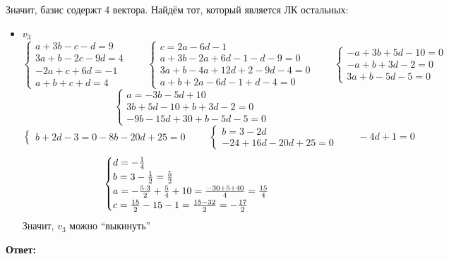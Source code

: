Значит, базис содержт 4 вектора. Найдём тот, который является ЛК остальных:
\begin{itemize}
	\item $ v_3 $
    $$
    \begin{cases}
    	a + 3b - c - d = 9 \\
        3a + b - 2c - 9d = 4 \\
        -2a + c + 6d = -1 \\
        a + b + c + d = 4
    \end{cases} \qquad
    \begin{cases}
    	c = 2a - 6d - 1 \\
        a + 3b - 2a + 6d - 1 - d - 9 = 0 \\
        3a + b - 4a + 12d + 2 - 9d - 4 = 0 \\
        a + b + 2a - 6d - 1 + d - 4 = 0
    \end{cases} \qquad
    \begin{cases}
    	-a + 3b + 5d - 10 = 0 \\
        -a + b + 3d - 2 = 0 \\
        3a + b - 5d - 5 = 0
    \end{cases} $$
    $$
    \begin{cases}
    	a = -3b - 5d + 10 \\
        3b + 5d - 10 + b + 3d - 2 = 0 \\
        -9b - 15d + 30 + b - 5d - 5 = 0
    \end{cases} $$
    $$
    \begin{cases}
    	b + 2d - 3 = 0
        -8b - 20d + 25 = 0
    \end{cases} \qquad
    \begin{cases}
    	b = 3 - 2d \\
        -24 + 16d - 20d + 25 = 0
    \end{cases} \qquad -4d + 1 = 0 $$
    $$
    \begin{cases}
    	d = -\frac14 \\
        b = 3 - \half = \half[5] \\
        a = -\half[5 \cdot 3] + \frac54 + 10 = \frac{-30 + 5 + 40}4 = \frac{15}4 \\
        c = \half[15] - 15 - 1 = \half[15 - 32] = -\half[17]
    \end{cases} $$
    Значит, $ v_3 $ можно ``выкинуть''
\end{itemize}
\textbf{Ответ:}
